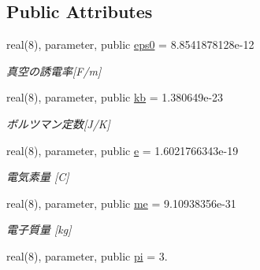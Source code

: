 \subsection*{Public Attributes}
\begin{DoxyCompactItemize}
\item 
\hypertarget{classparameters_a6e3f5cad65b2420f2dd2d3dc4e04804b}{real(8), parameter, public \hyperlink{classparameters_a6e3f5cad65b2420f2dd2d3dc4e04804b}{eps0} = 8.\-8541878128e-\/12}\label{classparameters_a6e3f5cad65b2420f2dd2d3dc4e04804b}

\begin{DoxyCompactList}\small\item\em 真空の誘電率\mbox{[}F/m\mbox{]} \end{DoxyCompactList}\item 
\hypertarget{classparameters_a425727f61406663b608747b678ef7779}{real(8), parameter, public \hyperlink{classparameters_a425727f61406663b608747b678ef7779}{kb} = 1.\-380649e-\/23}\label{classparameters_a425727f61406663b608747b678ef7779}

\begin{DoxyCompactList}\small\item\em ボルツマン定数\mbox{[}J/\-K\mbox{]} \end{DoxyCompactList}\item 
\hypertarget{classparameters_a946259232ec7586c1a1f418b66abb398}{real(8), parameter, public \hyperlink{classparameters_a946259232ec7586c1a1f418b66abb398}{e} = 1.\-6021766343e-\/19}\label{classparameters_a946259232ec7586c1a1f418b66abb398}

\begin{DoxyCompactList}\small\item\em 電気素量 \mbox{[}C\mbox{]} \end{DoxyCompactList}\item 
\hypertarget{classparameters_a184eec95b1cfbae0f1819df05e12edbf}{real(8), parameter, public \hyperlink{classparameters_a184eec95b1cfbae0f1819df05e12edbf}{me} = 9.\-10938356e-\/31}\label{classparameters_a184eec95b1cfbae0f1819df05e12edbf}

\begin{DoxyCompactList}\small\item\em 電子質量 \mbox{[}kg\mbox{]} \end{DoxyCompactList}\item 
\hypertarget{classparameters_a6c0362eae5a266d29018ce266b2bcb55}{real(8), parameter, public \hyperlink{classparameters_a6c0362eae5a266d29018ce266b2bcb55}{pi} = 3.}\label{classparameters_a6c0362eae5a266d29018ce266b2bcb55}


\end{DoxyCompactItemize}
